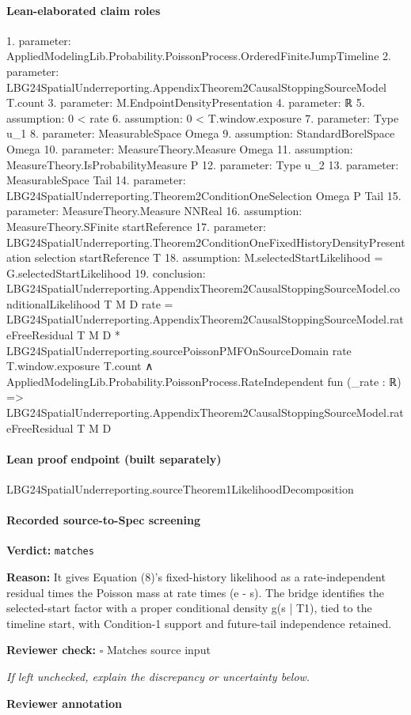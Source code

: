 \documentclass[10pt]{article}
\newcommand{\reviewerbox}{%
  \par\noindent\fbox{\parbox{0.96\linewidth}{\rule{0pt}{0.38in}}}\par
}
\newcommand{\reviewmatch}[1]{%
  \par\noindent\textbf{Reviewer check:} $\square$\; #1\par
  \noindent\emph{If left unchecked, explain the discrepancy or uncertainty below.}\par
}
\begin{document}
\paragraph{Lean-elaborated claim roles}\begin{ReviewVerbatim}
1. parameter: AppliedModelingLib.Probability.PoissonProcess.OrderedFiniteJumpTimeline
2. parameter: LBG24SpatialUnderreporting.AppendixTheorem2CausalStoppingSourceModel T.count
3. parameter: M.EndpointDensityPresentation
4. parameter: ℝ
5. assumption: 0 < rate
6. assumption: 0 < T.window.exposure
7. parameter: Type u_1
8. parameter: MeasurableSpace Omega
9. assumption: StandardBorelSpace Omega
10. parameter: MeasureTheory.Measure Omega
11. assumption: MeasureTheory.IsProbabilityMeasure P
12. parameter: Type u_2
13. parameter: MeasurableSpace Tail
14. parameter: LBG24SpatialUnderreporting.Theorem2ConditionOneSelection Omega P Tail
15. parameter: MeasureTheory.Measure NNReal
16. assumption: MeasureTheory.SFinite startReference
17. parameter: LBG24SpatialUnderreporting.Theorem2ConditionOneFixedHistoryDensityPresentation selection startReference T
18. assumption: M.selectedStartLikelihood = G.selectedStartLikelihood
19. conclusion: LBG24SpatialUnderreporting.AppendixTheorem2CausalStoppingSourceModel.conditionalLikelihood T M D rate =
    LBG24SpatialUnderreporting.AppendixTheorem2CausalStoppingSourceModel.rateFreeResidual T M D *
      LBG24SpatialUnderreporting.sourcePoissonPMFOnSourceDomain rate T.window.exposure T.count ∧
  AppliedModelingLib.Probability.PoissonProcess.RateIndependent fun (_rate : ℝ) =>
    LBG24SpatialUnderreporting.AppendixTheorem2CausalStoppingSourceModel.rateFreeResidual T M D
\end{ReviewVerbatim}

\paragraph{Lean proof endpoint (built separately)}\begin{ReviewVerbatim}
LBG24SpatialUnderreporting.sourceTheorem1LikelihoodDecomposition
\end{ReviewVerbatim}

\paragraph{Recorded source-to-Spec screening}
\textbf{Verdict:} \texttt{matches}
\\
{\raggedright
\textbf{Reason:} It gives Equation (8)'s fixed-\allowbreak{}history likelihood as a rate-\allowbreak{}independent residual times the Poisson mass at rate times (e -\allowbreak{} s).\allowbreak{} The bridge identifies the selected-\allowbreak{}start factor with a proper conditional density g(s | T1), tied to the timeline start, with Condition-\allowbreak{}1 support and future-\allowbreak{}tail independence retained.\allowbreak{}
\par}
\reviewmatch{Matches source input}
\noindent\textbf{Reviewer annotation}\par
\reviewerbox
\clearpage
\hypertarget{source-claim-4f511eea15da72c2}{}
\end{document}
